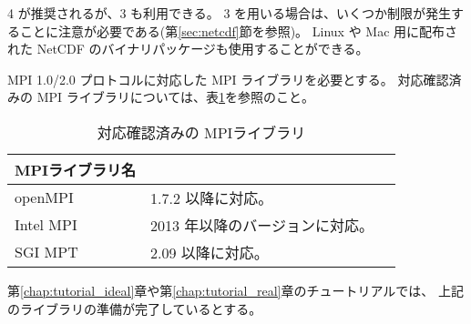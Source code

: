 {\netcdf}4 が推奨されるが、{\netcdf}3 も利用できる。
{\netcdf}3 を用いる場合は、いくつか制限が発生することに注意が必要である(第\ref{sec:netcdf}節を参照)。
Linux や Mac 用に配布された NetCDF のバイナリパッケージも使用することができる。


MPI 1.0/2.0 プロトコルに対応した MPI ライブラリを必要とする。
対応確認済みの MPI ライブラリについては、表\ref{tab:compatible_mpi}を参照のこと。

\begin{table}[htb]
\begin{center}
\caption{対応確認済みの MPIライブラリ}
\begin{tabularx}{150mm}{|l|X|X|} \hline
 \rowcolor[gray]{0.9} MPIライブラリ名 & \\ \hline
 openMPI   & 1.7.2 以降に対応。 \\ \hline
 Intel MPI & 2013 年以降のバージョンに対応。 \\ \hline
 SGI MPT   & 2.09 以降に対応。 \\ \hline
\end{tabularx}
\label{tab:compatible_mpi}
\end{center}
\end{table}


第\ref{chap:tutorial_ideal}章や第\ref{chap:tutorial_real}章のチュートリアルでは、
上記のライブラリの準備が完了しているとする。

